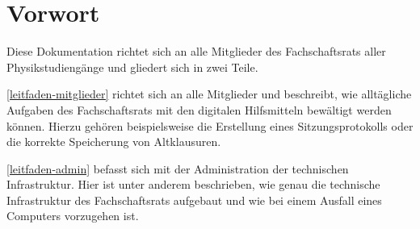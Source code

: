 \chapter{Vorwort}
\label{vorwort}
Diese Dokumentation richtet sich an alle Mitglieder des Fachschaftsrats aller Physikstudiengänge und gliedert sich in zwei Teile.

\autoref{leitfaden-mitglieder} richtet sich an alle Mitglieder und beschreibt, wie alltägliche Aufgaben des Fachschaftsrats mit den digitalen Hilfsmitteln bewältigt werden können. Hierzu gehören beispielsweise die Erstellung eines Sitzungsprotokolls oder die korrekte Speicherung von Altklausuren.

\autoref{leitfaden-admin} befasst sich mit der Administration der technischen Infrastruktur. Hier ist unter anderem beschrieben, wie genau die technische Infrastruktur des Fachschaftsrats aufgebaut und wie bei einem Ausfall eines Computers vorzugehen ist.
